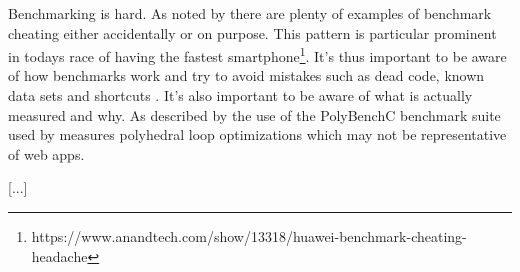 
Benchmarking is hard. As noted by \textcite{CaiNerurkarWu1998} there are plenty of examples of benchmark cheating either accidentally or on purpose. This pattern is particular prominent in todays race of having the fastest smartphone\footnote{https://www.anandtech.com/show/13318/huawei-benchmark-cheating-headache}. It's thus important to be aware of how benchmarks work and try to avoid mistakes such as dead code, known data sets and shortcuts \parencite{CaiNerurkarWu1998}. It's also important to be aware of what is actually measured and why. As described by \textcite{JangdaPowersGuhaBerger2019} the use of the PolyBenchC benchmark suite used by \textcite{HaasRossbergSchuffTitzerHolmanGohmanWagnerZakaiBastien2017} measures polyhedral loop optimizations which may not be representative of web apps. 

[...]

















